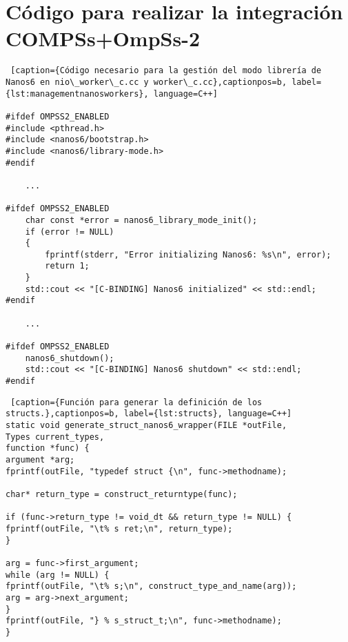 \section{Código para realizar la integración COMPSs+OmpSs-2}
\label{appendix:integration}

\begin{lstlisting} [caption={Código necesario para la gestión del modo librería de Nanos6 en nio\_worker\_c.cc y worker\_c.cc},captionpos=b, label={lst:managementnanosworkers}, language=C++]

#ifdef OMPSS2_ENABLED
#include <pthread.h>
#include <nanos6/bootstrap.h>
#include <nanos6/library-mode.h>
#endif

    ...

#ifdef OMPSS2_ENABLED
    char const *error = nanos6_library_mode_init();
    if (error != NULL)
    {
        fprintf(stderr, "Error initializing Nanos6: %s\n", error);
        return 1;
    }
    std::cout << "[C-BINDING] Nanos6 initialized" << std::endl;
#endif

    ...
    
#ifdef OMPSS2_ENABLED
    nanos6_shutdown();
    std::cout << "[C-BINDING] Nanos6 shutdown" << std::endl;
#endif

\end{lstlisting}

\bigskip

\begin{lstlisting} [caption={Función para generar la definición de los structs.},captionpos=b, label={lst:structs}, language=C++]
static void generate_struct_nanos6_wrapper(FILE *outFile, 
Types current_types,
function *func) {
argument *arg;
fprintf(outFile, "typedef struct {\n", func->methodname);

char* return_type = construct_returntype(func);

if (func->return_type != void_dt && return_type != NULL) {
fprintf(outFile, "\t% s ret;\n", return_type);
}

arg = func->first_argument;
while (arg != NULL) {
fprintf(outFile, "\t% s;\n", construct_type_and_name(arg));
arg = arg->next_argument;
}
fprintf(outFile, "} % s_struct_t;\n", func->methodname);
}
\end{lstlisting}

\newpage


